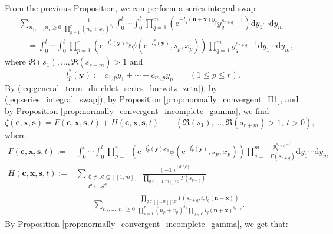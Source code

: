 \documentclass[a4paper]{amsart}
\theoremstyle{remark}
\theoremstyle{definition}
\newcommand{\dd}{\mathrm{d}}
\newcommand{\phie}{\mathrm{e}}
\begin{document}
From the previous Proposition, we can perform a series-integral swap
\begin{align}
    &\sum_{n_1,\ldots,n_r \geq 0} \frac{1}{\prod_{p=1}^r (n_p+x_p)^{s_p}} \int_{0}^{t} \cdots \int_{0}^{t} \prod_{q=1}^m \left(\phie^{-l_q(\mathbf{n}+\mathbf{x})y_q} y_q^{s_{r+q}-1}\right) \dd y_1 \cdots \dd y_m \nonumber \\
    & \quad = \int_{0}^{t} \cdots \int_{0}^{t} \prod_{p=1}^r \left( \phie^{-l_p^*(\mathbf{y})x_p} \phi(\phie^{-l_p^*(\mathbf{y})},s_{p},x_p) \right) \prod_{q=1}^{m}y_q^{s_{r+q}-1} \dd y_1 \cdots \dd y_m, \label{eq:series_integral_swap}
\end{align}
where $\Re(s_1),\ldots,\Re(s_{r+m})>1$ and
\begin{equation}
    l_p^*(\mathbf{y}):=c_{1,p}y_1+\cdots+c_{m,p}y_p \qquad (1 \leq p \leq r). \label{eq:def_l_star}
\end{equation}
By (\ref{eq:general_term_dirichlet_series_hurwitz_zeta}), by (\ref{eq:series_integral_swap}), by Proposition \ref{prop:normally_convergent_H1}, and by Proposition \ref{prop:normally_convergent_incomplete_gamma}, we find
\begin{equation}   
    \zeta(\mathbf{c},\mathbf{x},\mathbf{s})= F(\mathbf{c},\mathbf{x},\mathbf{s},t)+H(\mathbf{c},\mathbf{x},\mathbf{s},t) \qquad (\Re(s_1),\ldots,\Re(s_{r+m}) > 1, \ t>0), \label{eq:crandall_expansion_zeta}
\end{equation}
where
\begin{align}
    F(\mathbf{c},\mathbf{x},\mathbf{s},t) :=& \int_{0}^{t} \cdots \int_{0}^{t} \prod_{p=1}^r \left( \phie^{-l_p^*(\mathbf{y})x_p} \phi(\phie^{-l_p^*(\mathbf{y})},s_{p},x_p) \right) \prod_{q=1}^{m} \frac{y_q^{s_{r+q}-1}}{\Gamma(s_{r+q})} \dd y_1 \cdots \dd y_m \label{eq:def_F_primaire}\\
    H(\mathbf{c},\mathbf{x},\mathbf{s},t) :=& \sum_{\substack{\emptyset \neq \mathcal{A} \subseteq [\![1,m]\!] \\ \mathcal{C} \subseteq \mathcal{A}^c}} \frac{(-1)^{|\mathcal{A}^c \setminus \mathcal{C}|}}{\prod_{q \in [\![1,m]\!] \setminus \mathcal{C}} \Gamma(s_{r+q})} \label{eq:def_H_primaire} \\
    & \qquad \sum_{n_1,\ldots,n_r \geq 0} \frac{\prod_{q \in [\![ 1,m ]\!] \setminus \mathcal{C}} \Gamma(s_{r+q},t,l_q(\mathbf{n}+\mathbf{x}))}{\prod_{p=1}^{r} (n_p+x_p)^{s_p} \prod_{q \in \mathcal{C}} l_q(\mathbf{n}+\mathbf{x})^{s_{r+q}}}. \nonumber
\end{align}
By Proposition \ref{prop:normally_convergent_incomplete_gamma}, we get that:
\end{document}
